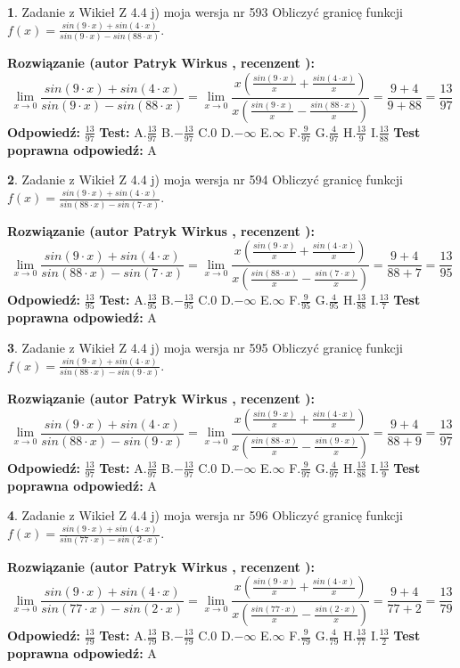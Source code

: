 \documentclass[12pt, a4paper]{article}
\theoremstyle{definition} %
\newtheorem{zad}{}
\newcommand{\zadStart}[1]{\begin{zad}#1\newline}
\newcommand{\zadStop}{\end{zad}}
\newcommand{\rozwStart}[2]{\noindent \textbf{Rozwiązanie (autor #1 , recenzent #2): }\newline}
\newcommand{\rozwStop}{\newline}
\newcommand{\odpStart}{\noindent \textbf{Odpowiedź:}\newline}
\newcommand{\odpStop}{\newline}
\newcommand{\testStart}{\noindent \textbf{Test:}\newline}
\newcommand{\testStop}{\newline}
\newcommand{\kluczStart}{\noindent \textbf{Test poprawna odpowiedź:}\newline}
\newcommand{\kluczStop}{\newline}
\begin{document}
\zadStart{Zadanie z Wikieł Z 4.4 j) moja wersja nr 593}
Obliczyć granicę funkcji $f(x)=\frac{sin(9\cdot x) +sin(4\cdot x)}{sin(9\cdot x) -sin(88\cdot x)}$.
\zadStop
\rozwStart{Patryk Wirkus}{}
$$\lim\limits_{x\to 0}\frac{sin(9\cdot x) +sin(4\cdot x)}{sin(9\cdot x) -sin(88\cdot x)}=\lim\limits_{x\to 0}\frac{x(\frac{sin(9\cdot x)}{x}+\frac{sin(4\cdot x)}{x})}{x(\frac{sin(9\cdot x)}{x}-\frac{sin(88\cdot x)}{x})}=\frac{9+4}{9+88} = \frac{13}{97}$$
\rozwStop
\odpStart
$\frac{13}{97}$
\odpStop
\testStart
A.$\frac{13}{97}$
B.$-\frac{13}{97}$
C.$0$
D.$-\infty$
E.$\infty$
F.$\frac{9}{97}$
G.$\frac{4}{97}$
H.$\frac{13}{9}$
I.$\frac{13}{88}$
\testStop
\kluczStart
A
\kluczStop



\zadStart{Zadanie z Wikieł Z 4.4 j) moja wersja nr 594}
Obliczyć granicę funkcji $f(x)=\frac{sin(9\cdot x) +sin(4\cdot x)}{sin(88\cdot x) -sin(7\cdot x)}$.
\zadStop
\rozwStart{Patryk Wirkus}{}
$$\lim\limits_{x\to 0}\frac{sin(9\cdot x) +sin(4\cdot x)}{sin(88\cdot x) -sin(7\cdot x)}=\lim\limits_{x\to 0}\frac{x(\frac{sin(9\cdot x)}{x}+\frac{sin(4\cdot x)}{x})}{x(\frac{sin(88\cdot x)}{x}-\frac{sin(7\cdot x)}{x})}=\frac{9+4}{88+7} = \frac{13}{95}$$
\rozwStop
\odpStart
$\frac{13}{95}$
\odpStop
\testStart
A.$\frac{13}{95}$
B.$-\frac{13}{95}$
C.$0$
D.$-\infty$
E.$\infty$
F.$\frac{9}{95}$
G.$\frac{4}{95}$
H.$\frac{13}{88}$
I.$\frac{13}{7}$
\testStop
\kluczStart
A
\kluczStop



\zadStart{Zadanie z Wikieł Z 4.4 j) moja wersja nr 595}
Obliczyć granicę funkcji $f(x)=\frac{sin(9\cdot x) +sin(4\cdot x)}{sin(88\cdot x) -sin(9\cdot x)}$.
\zadStop
\rozwStart{Patryk Wirkus}{}
$$\lim\limits_{x\to 0}\frac{sin(9\cdot x) +sin(4\cdot x)}{sin(88\cdot x) -sin(9\cdot x)}=\lim\limits_{x\to 0}\frac{x(\frac{sin(9\cdot x)}{x}+\frac{sin(4\cdot x)}{x})}{x(\frac{sin(88\cdot x)}{x}-\frac{sin(9\cdot x)}{x})}=\frac{9+4}{88+9} = \frac{13}{97}$$
\rozwStop
\odpStart
$\frac{13}{97}$
\odpStop
\testStart
A.$\frac{13}{97}$
B.$-\frac{13}{97}$
C.$0$
D.$-\infty$
E.$\infty$
F.$\frac{9}{97}$
G.$\frac{4}{97}$
H.$\frac{13}{88}$
I.$\frac{13}{9}$
\testStop
\kluczStart
A
\kluczStop



\zadStart{Zadanie z Wikieł Z 4.4 j) moja wersja nr 596}
Obliczyć granicę funkcji $f(x)=\frac{sin(9\cdot x) +sin(4\cdot x)}{sin(77\cdot x) -sin(2\cdot x)}$.
\zadStop
\rozwStart{Patryk Wirkus}{}
$$\lim\limits_{x\to 0}\frac{sin(9\cdot x) +sin(4\cdot x)}{sin(77\cdot x) -sin(2\cdot x)}=\lim\limits_{x\to 0}\frac{x(\frac{sin(9\cdot x)}{x}+\frac{sin(4\cdot x)}{x})}{x(\frac{sin(77\cdot x)}{x}-\frac{sin(2\cdot x)}{x})}=\frac{9+4}{77+2} = \frac{13}{79}$$
\rozwStop
\odpStart
$\frac{13}{79}$
\odpStop
\testStart
A.$\frac{13}{79}$
B.$-\frac{13}{79}$
C.$0$
D.$-\infty$
E.$\infty$
F.$\frac{9}{79}$
G.$\frac{4}{79}$
H.$\frac{13}{77}$
I.$\frac{13}{2}$
\testStop
\kluczStart
A
\kluczStop
\end{document}
